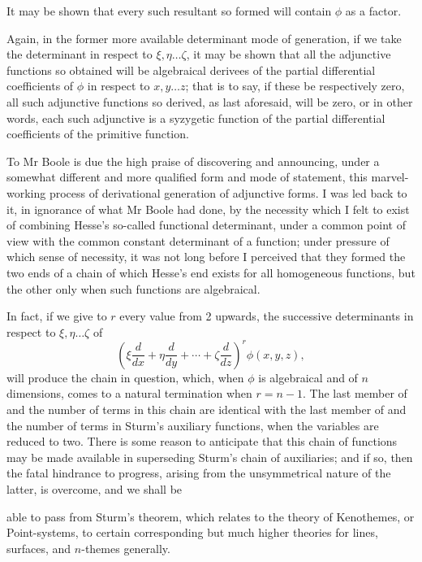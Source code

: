 \documentclass[11pt]{article}
\newcommand{\sourcepage}[1]{\marginpar{\scriptsize p.~#1}}
\begin{document}
{{It may be shown that every such resultant so formed will contain $\phi$ as a factor.

Again, in the former more available determinant mode of generation, if we take the determinant in respect to $\xi,\eta\ldots\zeta$, it may be shown that all the adjunctive functions so obtained will be algebraical derivees of the partial differential coefficients of $\phi$ in respect to $x,y\ldots z$; that is to say, if these be respectively zero, all such adjunctive functions so derived, as last aforesaid, will be zero, or in other words, each such adjunctive is a syzygetic function of the partial differential coefficients of the primitive function.

To Mr Boole is due the high praise of discovering and announcing, under a somewhat different and more qualified form and mode of statement, this marvel-working process of derivational generation of adjunctive forms. I was led back to it, in ignorance of what Mr Boole had done, by the necessity which I felt to exist of combining Hesse's so-called functional determinant, under a common point of view with the common constant determinant of a function; under pressure of which sense of necessity, it was not long before I perceived that they formed the two ends of a chain of which Hesse's end exists for all homogeneous functions, but the other only when such functions are algebraical.

In fact, if we give to $r$ every value from 2 upwards, the successive determinants in respect to $\xi,\eta\ldots\zeta$ of
\[
 \left(\xi\frac{d}{dx}+\eta\frac{d}{dy}+\cdots+\zeta\frac{d}{dz}\right)^r
 \phi(x,y,z),
\]
will produce the chain in question, which, when $\phi$ is algebraical and of $n$ dimensions, comes to a natural termination when $r=n-1$. The last member of and the number of terms in this chain are identical with the last member of and the number of terms in Sturm's auxiliary functions, when the variables are reduced to two. There is some reason to anticipate that this chain of functions may be made available in superseding Sturm's chain of auxiliaries; and if so, then the fatal hindrance to progress, arising from the unsymmetrical nature of the latter, is overcome, and we shall be

\sourcepage{188}
able to pass from Sturm's theorem, which relates to the theory of Kenothemes, or Point-systems, to certain corresponding but much higher theories for lines, surfaces, and $n$-themes generally.

}}
\end{document}
